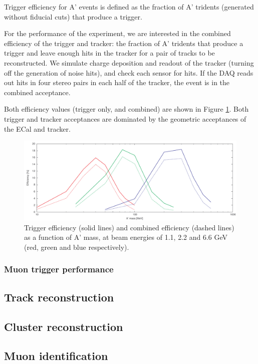 Trigger efficiency for A' events is defined as the fraction of A' tridents (generated without fiducial cuts) that produce a trigger.

For the performance of the experiment, we are interested in the combined efficiency of the trigger and tracker: the fraction of A' tridents that produce a trigger and leave enough hits in the tracker for a pair of tracks to be reconstructed.
We simulate charge deposition and readout of the tracker (turning off the generation of noise hits), and check each sensor for hits. 
If the DAQ reads out hits in four stereo pairs in each half of the tracker, the event is in the combined acceptance.

Both efficiency values (trigger only, and combined) are shown in Figure \ref{fig:trigeff}. 
Both trigger and tracker acceptances are dominated by the geometric acceptances of the ECal and tracker.

\begin{figure}[ht]
	\includegraphics[width=\textwidth]{performance/ap_eff}
	\caption{\small{Trigger efficiency (solid lines) and combined efficiency (dashed lines) as a function of A' mass, at beam energies of 1.1, 2.2 and 6.6 GeV (red, green and blue respectively).}}
	\label{fig:trigeff}
\end{figure}

\subsubsection{Muon trigger performance}

\subsection{Track reconstruction}

\subsection{Cluster reconstruction}

\subsection{Muon identification}

